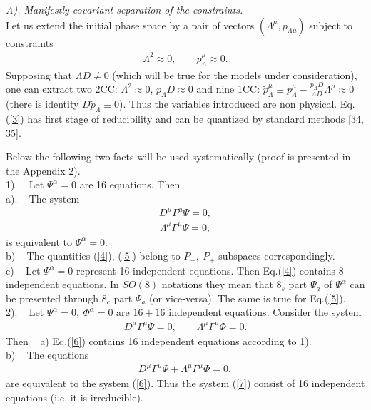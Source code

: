 \documentclass[a4paper]{article}
\begin{document}
{\em A). Manifestly covariant separation of the constraints.} \\
Let us extend the initial phase space by
a pair of vectors $(\Lambda^\mu, p_{\Lambda\mu})$ subject to
constraints
\begin{eqnarray}\label{3}
\Lambda^2\approx0, \qquad p^\mu_\Lambda\approx0.
\end{eqnarray}
Supposing that $\Lambda D\ne0$ (which will be true for the models under
consideration), one can extract two 2CC:
$\Lambda^2\approx0$, $p_\Lambda D\approx0$ and nine 1CC: $\tilde
p^\mu_\Lambda\equiv p^\mu_\Lambda-\frac{p_\Lambda D}{\Lambda
D}\Lambda^\mu\approx0$ (there is identity $D\tilde
p_\Lambda\equiv0$). Thus the variables introduced are non physical. 
Eq.(\ref{3}) has first stage of reducibility 
and can be quantized by standard methods [34, 35].

Below the following two facts will be used systematically (proof is 
presented in the Appendix 2). \\
1). ~ Let $\Psi^\alpha=0$ are 16 equations. Then \\
a). ~ The system 
\begin{eqnarray}\label{4}
D^\mu\Gamma^\mu\Psi=0,
\end{eqnarray}
\begin{eqnarray}\label{5}
\Lambda^\mu\Gamma^\mu\Psi=0,
\end{eqnarray}
is equivalent to $\Psi^\alpha=0$. \\
b) ~ The quantities (\ref{4}), (\ref{5}) belong to $P_-, ~ P_+$ 
subspaces correspondingly. \\
c) ~ Let $\Psi^\alpha=0$ represent 16 independent equations. Then 
Eq.(\ref{4}) contains 8 independent equations. In $SO(8)$ notations 
they mean that $8_s$ part $\bar\Psi_{\dot a}$ of $\Psi^\alpha$ can be 
presented through $8_c$ part $\Psi_a$ (or vice-versa). The same is 
true for Eq.(\ref{5}). \\
2). ~ Let $\Psi^\alpha=0, ~ \Phi^\alpha=0$ are $16+16$ independent 
equations. Consider the system 
\begin{eqnarray}\label{6}
D^\mu\Gamma^\mu\Psi=0, \qquad
\Lambda^\mu\Gamma^\mu\Phi=0.
\end{eqnarray}
Then ~ a) Eq.(\ref{6}) contains 16 independent equations according 
to 1). \\
b) ~ The equations 
\begin{eqnarray}\label{7}
D^\mu\Gamma^\mu\Psi+\Lambda^\mu\Gamma^\mu\Phi=0,
\end{eqnarray}
are equivalent to the system (\ref{6}). Thus the system (\ref{7}) 
consist of 16 independent equations (i.e. it is irreducible). 
\end{document}
